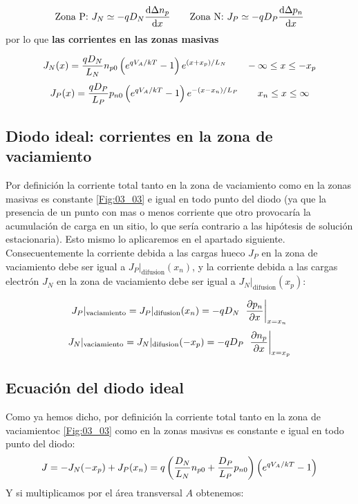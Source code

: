 \begin{equation} 
    \text{Zona P:} \ J_N \simeq -qD_N \frac{\mathrm{d} \Delta n_p}{\mathrm{d} x} \qquad \text{Zona N:} \ J_P \simeq -qD_P \frac{\mathrm{d} \Delta p_n}{\mathrm{d} x}
\end{equation}
por lo que \textbf{las corrientes en las zonas masivas}

\begin{equation}
    J_N (x) = \frac{qD_N}{L_N} n_{p0} \left( e^{qV_A/kT}-1 \right) e^{(x+x_p)/L_N} \qquad -\infty \leq x \leq -x_p \end{equation} \begin{equation} J_P (x) = \frac{qD_P}{L_P} p_{n0} \left( e^{qV_A/kT}-1 \right) e^{-(x-x_n)/L_P} \qquad x_n \leq x \leq \infty
\end{equation}

\subsection{Diodo ideal: corrientes en la zona de vaciamiento}

Por definición la corriente total tanto en la zona de vaciamiento como en la zonas masivas es constante \cref{Fig:03_03} e igual en todo punto del diodo (ya que la presencia de un punto con mas o menos corriente que otro provocaría la acumulación de carga en un sitio, lo que sería contrario a las hipótesis de solución estacionaria). Esto mismo lo aplicaremos en el apartado siguiente. Consecuentemente la corriente debida a las cargas hueco $J_P$ en la zona de vaciamiento debe ser igual a $J_P|_{\text{difusion}} (x_n)$, y la corriente debida a las cargas electrón $J_N$ en la zona de vaciamiento debe ser igual a $J_N|_{\text{difusion}} (x_p)$:

\begin{equation}
    J_P |_{\text{vaciamiento}} = J_P|_{\text{difusion}} (x_n) = - q D_N  \ \eval{\parciales{p_n}{x}}_{x=x_n} \end{equation}
\begin{equation}     
    J_N |_{\text{vaciamiento}} = J_N|_{\text{difusion}} (-x_p) = - q D_P  \ \eval{\parciales{n_p}{x}}_{x=x_p}
\end{equation}

\subsection{Ecuación del diodo ideal}

Como ya hemos dicho, por definición la corriente total tanto en la zona de vaciamientoc \cref{Fig:03_03} como en la zonas masivas es constante e igual en todo punto del  diodo:
\begin{equation}
    J = - J_N (-x_p) + J_P (x_n) = q \left( \frac{D_N}{L_N} n_{p0} + \frac{D_P}{L_P} p_{n0} \right) \left( e^{qV_A/kT}-1 \right)
\end{equation}
Y si multiplicamos por el área transversal $A$ obtenemos:

